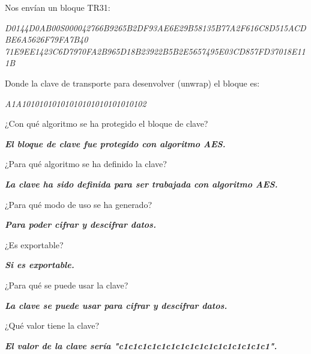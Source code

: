 \documentclass[12pt,oneside,a4paper]{book}
\begin{document}
Nos envían un bloque TR31:

\vspace{1em}

\textit{D0144D0AB00S000042766B9265B2DF93AE6E29B58135B77A2F616C8D515ACDBE6A5626F79FA7B40}
\newline
\textit{71E9EE1423C6D7970FA2B965D18B23922B5B2E5657495E03CD857FD37018E111B}

\vspace{1em}

Donde la clave de transporte para desenvolver (unwrap) el bloque es:

\vspace{1em}

\textit{A1A10101010101010101010101010102}

\vspace{1em}

¿Con qué algoritmo se ha protegido el bloque de clave?

\vspace{1em}

\hspace{20pt}
\textbf{\textit{El bloque de clave fue protegido con algoritmo AES.}}

\hspace{1em}

¿Para qué algoritmo se ha definido la clave?

\vspace{1em}

\hspace{20pt}
\textbf{\textit{La clave ha sido definida para ser trabajada con algoritmo AES.}}

\vspace{1em}

¿Para qué modo de uso se ha generado?

\vspace{1em}

\hspace{20pt}
\textbf{\textit{Para poder cifrar y descifrar datos.}}

\vspace{1em}

¿Es exportable?

\vspace{1em}

\hspace{20pt}
\textbf{\textit{Si es exportable.}}

\vspace{1em}

¿Para qué se puede usar la clave?

\vspace{1em}

\hspace{20pt}
\textbf{\textit{La clave se puede usar para cifrar y descifrar datos.}}

\vspace{1em}

¿Qué valor tiene la clave?

\vspace{1em}

\textbf{\textit{El valor de la clave sería "c1c1c1c1c1c1c1c1c1c1c1c1c1c1c1c1".}}
\end{document}
